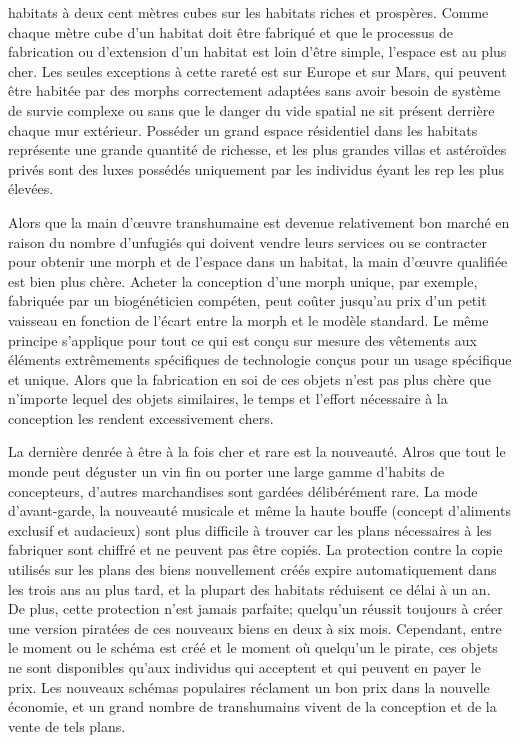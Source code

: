                habitats à deux cent mètres cubes sur les habitats riches et prospères. Comme chaque mètre cube d'un habitat doit être fabriqué et que le processus de fabrication ou d'extension d'un habitat est loin d'être simple, l'espace est au plus cher. Les seules exceptions à cette rareté est sur Europe et sur Mars, qui peuvent être habitée par des morphs correctement adaptées sans avoir besoin de système de survie complexe ou sans que le danger du vide spatial ne sit présent derrière chaque mur extérieur. Posséder un grand espace résidentiel dans les habitats représente une grande quantité de richesse, et les plus grandes villas et astéroïdes privés sont des luxes possédés uniquement par les individus éyant les rep les plus élevées. 

               Alors que la main d'œuvre transhumaine est devenue relativement bon marché en raison du nombre d'unfugiés qui doivent vendre leurs services ou se contracter pour obtenir une morph et de l'espace dans un habitat, la main d'œuvre qualifiée est bien plus chère. Acheter la conception d'une morph unique, par exemple, fabriquée par un biogénéticien compéten, peut coûter jusqu'au prix d'un petit vaisseau en fonction de l'écart entre la morph et le modèle standard. Le même principe s'applique pour tout ce qui est conçu sur mesure des vêtements aux éléments extrêmements spécifiques de technologie conçus pour un usage spécifique et unique. Alors que la fabrication en soi de ces objets n'est pas plus chère que n'importe lequel des objets similaires, le temps et l'effort nécessaire à la conception les rendent excessivement chers. 

               La dernière denrée à être à la fois cher et rare est la nouveauté. Alros que tout le monde peut déguster un vin fin ou porter une large gamme d'habits de concepteurs, d'autres marchandises sont gardées délibérément rare. La mode d'avant-garde, la nouveauté musicale et même la haute bouffe (concept d'aliments exclusif et audacieux) sont plus difficile à trouver car les plans nécessaires à les fabriquer sont chiffré et ne peuvent pas être copiés. La protection contre la copie utilisés sur les plans des biens nouvellement créés expire automatiquement dans les trois ans au plus tard, et la plupart des habitats réduisent ce délai à un an. De plus, cette protection n'est jamais parfaite; quelqu'un réussit toujours à créer une version piratées de ces nouveaux biens en deux à six mois. Cependant, entre le moment ou le schéma est créé et le moment où quelqu'un le pirate, ces objets ne sont disponibles qu'aux individus qui acceptent et qui peuvent en payer le prix. Les nouveaux schémas populaires réclament un bon prix dans la nouvelle économie, et un grand nombre de transhumains vivent de la conception et de la vente de tels plans. 

